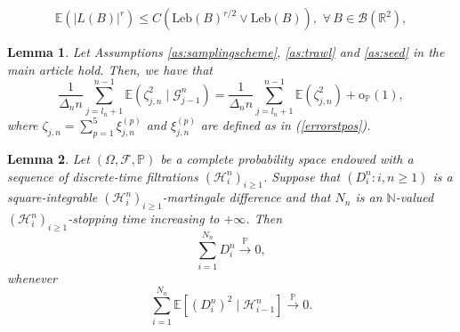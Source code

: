 \documentclass[10pt,a4paper]{amsart}
\newtheorem{lemma}{Lemma}
\begin{document}
 \begin{equation}
\mathbb{E}(\rvert L(B)\rvert^{r})\leq C(\mathrm{Leb}(B)^{r/2}\lor\mathrm{Leb}(B)),\,\,\forall\,\ensuremath{B\in\mathcal{B}(\mathbb{R}^{2}),}\label{momentineq}
\end{equation}  

\begin{lemma}\label{lemmaavar}Let Assumptions \ref{as:samplingscheme},
	\ref{as:trawl} and \ref{as:seed} in  the main article hold. 
	Then, we have that 
	\[
	\frac{1}{\Delta_{n}n}\sum_{j=l_{n}+1}^{n-1}\mathbb{E}(\zeta_{j,n}^{2}\mid\mathscr{G}_{j-1}^{n})=\frac{1}{\Delta_{n}n}\sum_{j=l_{n}+1}^{n-1}\mathbb{E}(\zeta_{j,n}^{2})+\mathrm{o}_{\mathbb{P}}(1),
	\]
	where $\zeta_{j,n}=\sum_{p=1}^{5}\xi_{j,n}^{(p)}$ and $\xi_{j,n}^{(p)}$ are defined as in (\ref{errorstpos}). 
	
\end{lemma}

\begin{lemma}\label{lemmapproxgammahat-1}Let $(\Omega,\mathscr{F},\mathbb{P})$
	be a complete probability space endowed with a sequence of discrete-time
	filtrations $(\mathscr{H}_{i}^{n})_{i\geq1}$. Suppose that $(D_{i}^{n}:i,n\geq1)$
	is a square-integrable $(\mathscr{H}_{i}^{n})_{i\geq1}$-martingale
	difference and that $N_{n}$ is an $\mathbb{N}$-valued $(\mathscr{H}_{i}^{n})_{i\geq1}$-stopping
	time increasing to $+\infty$. Then 
	\[
	\sum_{i=1}^{N_{n}}D_{i}^{n}\overset{\mathbb{P}}{\rightarrow}0,
	\]
	whenever 
	\[
	\sum_{i=1}^{N_{n}}\mathbb{E}\left[(D_{i}^{n})^{2}\mid\mathscr{H}_{i-1}^{n}\right]\overset{\mathbb{P}}{\rightarrow}0.
	\]
	
\end{lemma}
\end{document}
